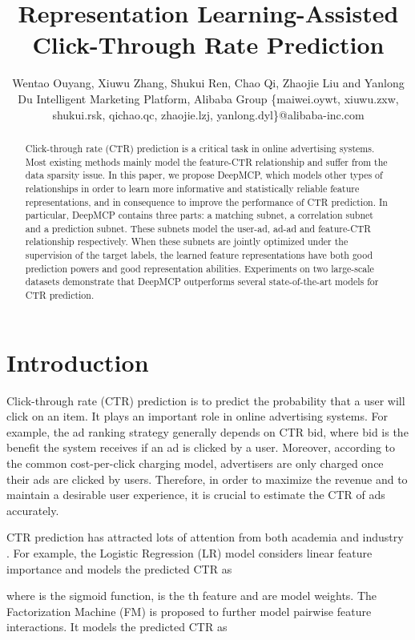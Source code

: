 \documentclass{article}
\title{Representation Learning-Assisted Click-Through Rate Prediction}
\author{
    Wentao Ouyang, Xiuwu Zhang, Shukui Ren, Chao Qi, Zhaojie Liu \textnormal{and} Yanlong Du
    \affiliations
    Intelligent Marketing Platform, Alibaba Group
    \emails
    \{maiwei.oywt, xiuwu.zxw, shukui.rsk, qichao.qc, zhaojie.lzj, yanlong.dyl\}@alibaba-inc.com
}
\begin{document}
\maketitle

\begin{abstract}
Click-through rate (CTR) prediction is a critical task in online advertising systems. Most existing methods mainly model the feature-CTR relationship and suffer from the data sparsity issue. In this paper, we propose DeepMCP, which models other types of relationships in order to learn more informative and statistically reliable feature representations, and in consequence to improve the performance of CTR prediction. In particular, DeepMCP contains three parts: a matching subnet, a correlation subnet and a prediction subnet. These subnets model the user-ad, ad-ad and feature-CTR relationship respectively. When these subnets are jointly optimized under the supervision of the target labels, the learned feature representations have both good prediction powers and good representation abilities. Experiments on two large-scale datasets demonstrate that DeepMCP outperforms several state-of-the-art models for CTR prediction.
\end{abstract}

\section{Introduction}
Click-through rate (CTR) prediction is to predict the probability that a user will click on an item. It plays an important role in online advertising systems. For example, the ad ranking strategy generally depends on CTR  bid, where bid is the benefit the system receives if an ad is clicked by a user. Moreover, according to the common cost-per-click charging model, advertisers are only charged once their ads are clicked by users. Therefore, in order to maximize the revenue and to maintain a desirable user experience, it is crucial to estimate the CTR of ads accurately.

CTR prediction has attracted lots of attention from both academia and industry \cite{he2014practical,shan2016deep,guo2017deepfm}.
For example, the Logistic Regression (LR) model \cite{richardson2007predicting} considers linear feature importance and models the predicted CTR as

where  is the sigmoid function,  is the th feature and  are model weights.
The Factorization Machine (FM) \cite{rendle2010factorization} is proposed to further model pairwise feature interactions. It models the predicted CTR as
\end{document}
